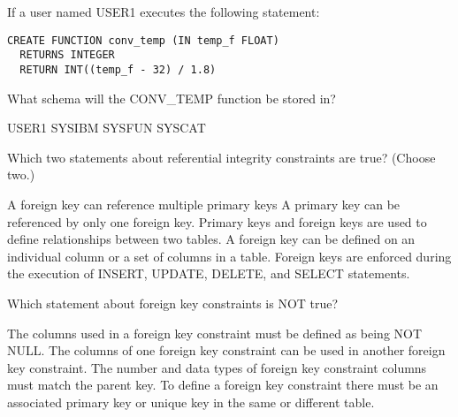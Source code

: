 \documentclass[11pt]{exam}
\begin{document}
\begin{questions}
\question[1]
If a user named USER1 executes the following statement:
\begin{verbatim}
CREATE FUNCTION conv_temp (IN temp_f FLOAT)
  RETURNS INTEGER
  RETURN INT((temp_f - 32) / 1.8)
\end{verbatim}
What schema will the CONV_TEMP function be stored in?
\begin{choices}
\choice USER1
\choice SYSIBM
\choice SYSFUN
\choice SYSCAT
\end{choices}

\question[1]
Which two statements about referential integrity constraints are true? (Choose two.)
\begin{choices}
\choice A foreign key can reference multiple primary keys
\choice A primary key can be referenced by only one foreign key.
\choice Primary keys and foreign keys are used to define relationships between two tables. 
\choice A foreign key can be defined on an individual column or a set of columns in a table.
\choice Foreign keys are enforced during the execution of INSERT, UPDATE, DELETE, and SELECT statements.
\end{choices}

\question[1]
Which statement about foreign key constraints is NOT true?
\begin{choices}
\choice The columns used in a foreign key constraint must be defined as being NOT NULL.
\choice The columns of one foreign key constraint can be used in another foreign key constraint.
\choice The number and data types of foreign key constraint columns must match the parent key.
\choice To define a foreign key constraint there must be an associated primary key or unique key in the same or different
table.
\end{choices}
\question[1]

\begin{choices}
\choice 
\choice 
\choice 
\choice 
\end{choices}
\question[1]

\begin{choices}
\choice 
\choice 
\choice 
\choice 
\end{choices}
\question[1]

\begin{choices}
\choice 
\choice 
\choice 
\choice 
\end{choices}
\question[1]

\begin{choices}
\choice 
\choice 
\choice 
\choice 
\end{choices}
\question[1]


\end{questions}
\end{document}
